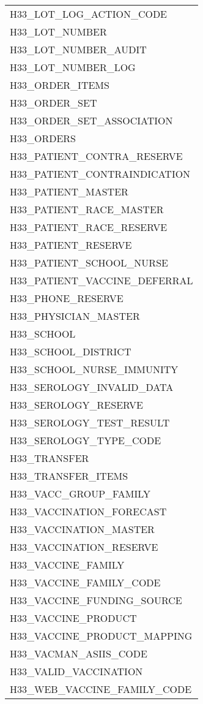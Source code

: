 \documentclass[
  letterpaper,
  DIV=11,
  numbers=noendperiod]{scrreprt}
\begin{document}
\begin{longtable}{l}
H33\_LOT\_LOG\_ACTION\_CODE \\ 
H33\_LOT\_NUMBER \\ 
H33\_LOT\_NUMBER\_AUDIT \\ 
H33\_LOT\_NUMBER\_LOG \\ 
H33\_ORDER\_ITEMS \\ 
H33\_ORDER\_SET \\ 
H33\_ORDER\_SET\_ASSOCIATION \\ 
H33\_ORDERS \\ 
H33\_PATIENT\_CONTRA\_RESERVE \\ 
H33\_PATIENT\_CONTRAINDICATION \\ 
H33\_PATIENT\_MASTER \\ 
H33\_PATIENT\_RACE\_MASTER \\ 
H33\_PATIENT\_RACE\_RESERVE \\ 
H33\_PATIENT\_RESERVE \\ 
H33\_PATIENT\_SCHOOL\_NURSE \\ 
H33\_PATIENT\_VACCINE\_DEFERRAL \\ 
H33\_PHONE\_RESERVE \\ 
H33\_PHYSICIAN\_MASTER \\ 
H33\_SCHOOL \\ 
H33\_SCHOOL\_DISTRICT \\ 
H33\_SCHOOL\_NURSE\_IMMUNITY \\ 
H33\_SEROLOGY\_INVALID\_DATA \\ 
H33\_SEROLOGY\_RESERVE \\ 
H33\_SEROLOGY\_TEST\_RESULT \\ 
H33\_SEROLOGY\_TYPE\_CODE \\ 
H33\_TRANSFER \\ 
H33\_TRANSFER\_ITEMS \\ 
H33\_VACC\_GROUP\_FAMILY \\ 
H33\_VACCINATION\_FORECAST \\ 
H33\_VACCINATION\_MASTER \\ 
H33\_VACCINATION\_RESERVE \\ 
H33\_VACCINE\_FAMILY \\ 
H33\_VACCINE\_FAMILY\_CODE \\ 
H33\_VACCINE\_FUNDING\_SOURCE \\ 
H33\_VACCINE\_PRODUCT \\ 
H33\_VACCINE\_PRODUCT\_MAPPING \\ 
H33\_VACMAN\_ASIIS\_CODE \\ 
H33\_VALID\_VACCINATION \\ 
H33\_WEB\_VACCINE\_FAMILY\_CODE \\ 
\bottomrule
\end{longtable}
\end{document}
